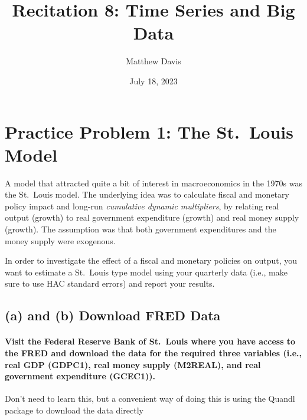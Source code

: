 \documentclass[
]{article}
\title{Recitation 8: Time Series and Big Data}
\author{Matthew Davis}
\date{July 18, 2023}
\begin{document}
\maketitle

\hypertarget{practice-problem-1-the-st.-louis-model}{%
\section{Practice Problem 1: The St.~Louis
Model}\label{practice-problem-1-the-st.-louis-model}}

A model that attracted quite a bit of interest in macroeconomics in the
1970s was the St.~Louis model. The underlying idea was to calculate
fiscal and monetary policy impact and long-run \emph{cumulative dynamic
multipliers}, by relating real output (growth) to real government
expenditure (growth) and real money supply (growth). The assumption was
that both government expenditures and the money supply were exogenous.

In order to investigate the effect of a fiscal and monetary policies on
output, you want to estimate a St.~Louis type model using your quarterly
data (i.e., make sure to use HAC standard errors) and report your
results.

\hypertarget{a-and-b-download-fred-data}{%
\subsection{(a) and (b) Download FRED
Data}\label{a-and-b-download-fred-data}}

\hypertarget{visit-the-federal-reserve-bank-of-st.-louis-where-you-have-access-to-the-fred-and-download-the-data-for-the-required-three-variables-i.e.-real-gdp-gdpc1-real-money-supply-m2real-and-real-government-expenditure-gcec1.}{%
\paragraph{Visit the Federal Reserve Bank of St.~Louis where you have
access to the FRED and download the data for the required three
variables (i.e., real GDP (GDPC1), real money supply (M2REAL), and real
government expenditure
(GCEC1)).}\label{visit-the-federal-reserve-bank-of-st.-louis-where-you-have-access-to-the-fred-and-download-the-data-for-the-required-three-variables-i.e.-real-gdp-gdpc1-real-money-supply-m2real-and-real-government-expenditure-gcec1.}}

Don't need to learn this, but a convenient way of doing this is using
the Quandl package to download the data directly
\end{document}

